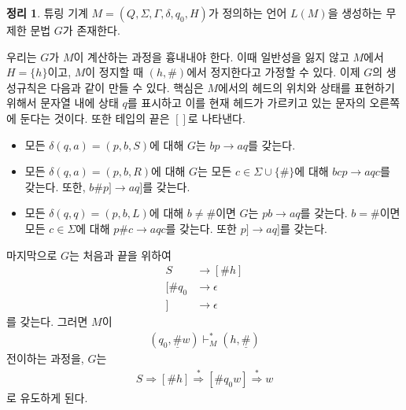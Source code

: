 \documentclass[b5paper, 11pt]{book}
\theoremstyle{definition}
\newtheorem{thm}[defn]{정리}
\newenvironment{pf*}{\pushQED{\qed}\pf}
{\popQED\endpf}
\begin{document}
\begin{thm}
    튜링 기계 $M = (Q, \Sigma, \Gamma, \delta, q_0, H)$가 정의하는 언어 $L(M)$을 생성하는 무제한 문법 $G$가 존재한다.
\end{thm}
\begin{pf*}
    우리는 $G$가 $M$이 계산하는 과정을 흉내내야 한다. 이때 일반성을 잃지 않고 $M$에서 $H = \{h\}$이고, $M$이 정지할 때 $(h, \#)$에서 정지한다고 가정할 수 있다. 이제 $G$의 생성규칙은 다음과 같이 만들 수 있다. 핵심은 $M$에서의 헤드의 위치와 상태를 표현하기 위해서 문자열 내에 상태 $q$를 표시하고 이를 현재 헤드가 가르키고 있는 문자의 오른쪽에 둔다는 것이다. 또한 테입의 끝은 $[]$로 나타낸다.
    \begin{itemize}
        \item 모든 $\delta(q, a) = (p, b, S)$에 대해 $G$는 $bp \rightarrow aq$를 갖는다.
        \item 모든 $\delta(q, a) = (p, b, R)$에 대해 $G$는 모든 $c \in \Sigma \cup \{\#\}$에 대해 $bcp \rightarrow aqc$를 갖는다. 또한, $b\# p] \rightarrow aq]$를 갖는다.
        \item 모든 $\delta(q, q) = (p, b, L)$에 대해 $b \neq \#$이면 $G$는 $pb \rightarrow aq$를 갖는다. $b = \#$이면 모든 $c \in \Sigma$에 대해 $p\# c \rightarrow aqc$를 갖는다. 또한 $p] \rightarrow aq]$를 갖는다. 
    \end{itemize}
    마지막으로 $G$는 처음과 끝을 위하여
    \begin{align*}
        S &\rightarrow [\# h] \\ 
        [\#q_0 &\rightarrow \epsilon \\ 
        ] &\rightarrow \epsilon
    \end{align*}
    를 갖는다. 그러면 $M$이 
    \begin{align*}
        (q_0, \underline{\#}w) \vdash_M^* (h, \underline{\#})
    \end{align*}
    전이하는 과정을, $G$는 
    \begin{align*}
        S \Rightarrow [\# h] \overset{*}{\Rightarrow} [\#q_0 w] 
        \overset{*}{\Rightarrow} w
    \end{align*}
    로 유도하게 된다. 
\end{pf*}
\end{document}
